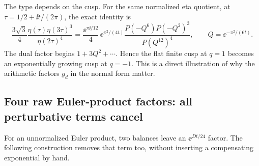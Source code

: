 The type depends on the cusp.  For the same normalized eta
quotient, at
\(\tau=1/2+\ii t/(2\pi)\), the exact identity is
\begin{equation}\label{eq:eta-minus-one}
 \frac{3\sqrt3}{4}
 \frac{\eta(\tau)\eta(3\tau)^3}{\eta(2\tau)^4}
 =
 \frac{\ee^{\pi\ii/12}}4\,
 \ee^{\pi^2/(4t)}
 \frac{P(-Q^6)P(-Q^2)^3}{P(Q^{12})^4},
 \qquad Q=\ee^{-\pi^2/(6t)}.
\end{equation}
The dual factor begins \(1+3Q^2+\cdots\).
Hence the flat finite cusp at \(q=1\) becomes an exponentially
growing cusp at \(q=-1\).
This is a direct illustration of why the arithmetic factors
\(g_d\) in the normal form matter.

\subsection{Four raw Euler-product factors: all perturbative terms cancel}

For an unnormalized Euler product, two balances leave an
\(\ee^{Dt/24}\) factor.  The following construction removes that
term too, without inserting a compensating exponential by hand.

